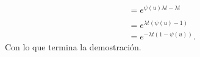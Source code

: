 \begin{align}
                        &=  e^{\psi(u) \lambda t - \lambda t}                                                                                       \\                                       \\
                        &=  e^{\lambda t (\psi(u) - 1)}                                                                                             \\        
                        &=  e^{-\lambda t (1 - \psi(u))}.                  
\end{align}\pn
Con lo que termina la demostración.